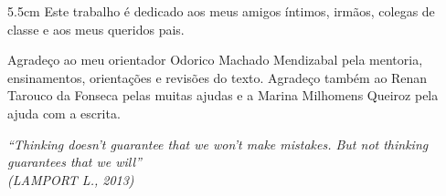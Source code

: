 \begin{dedicatoria}
\vspace*{\fill}
\noindent
\begin{adjustwidth*}{}{5.5cm} 
\raggedleft       
Este trabalho é dedicado aos meus amigos íntimos, irmãos, colegas de classe e aos meus queridos pais.
\end{adjustwidth*}
\end{dedicatoria}

\begin{agradecimentos}
Agradeço ao meu orientador Odorico Machado Mendizabal pela mentoria, ensinamentos, orientações e revisões do texto. Agradeço também ao Renan Tarouco da Fonseca pelas muitas ajudas e a Marina Milhomens Queiroz pela ajuda com a escrita.
\end{agradecimentos}

\begin{epigrafe}
\vspace*{\fill}
\begin{flushright}
\textit{``Thinking doesn't guarantee that we won't make mistakes. But not thinking guarantees that we will''\\
(LAMPORT L., 2013)}
\end{flushright}
\end{epigrafe}




